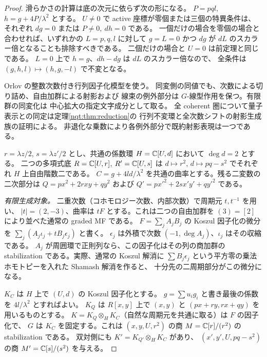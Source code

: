 \begin{proof}
滑らかさの計算は底の次元に依らず次の形になる。
$P=pql$, $h=g+4P/\lambda^2$ とする。
$U\ne0$ で active 座標が零個または三個の特異条件は、
それぞれ $dg=0$ または $P\ne0,\ dh=0$ である。
一個だけの場合を零個の場合と合わせれば、いずれかの $L=p,q,l$ に対して
$g=L=0$ かつ $dg$ が $dL$ のスカラー倍となることも排除すべきである。
二個だけの場合と $U=0$ は前定理と同じである。
$L=0$ 上で $h=g$、$dh-dg$ は $dL$ のスカラー倍なので、
全条件は $(g,h,l)\mapsto(h,g,-l)$ で不変となる。

Orlov の整数次数付き行列因子化模型を使う。
同変側の同値でも、次数による切り詰め、自由加群による射影および
線束の例外部分は $G$-線型作用を保つ。有限群の同変化は
中心拡大の指定文字成分として取る。
全 coherent 圏について量子表示との同定は定理\ref{nqt:thm:reduction}の
行列不変環と全次数シフトの射影生成族の証明による。
非退化な乗数により各例外部分で既約射影表現は一つである。

$r=\lambda z/2$, $s=\lambda z'/2$ とし、共通の係数環
$H=\mathbb C[U,d]$ において $\deg d=2$ とする。
二つの多項式底 $R=\mathbb C[U,r]$, $R'=\mathbb C[U,s]$ は
$d\mapsto r^2$, $d\mapsto pq-s^2$ でそれぞれ $H$ 上自由階数二である。
$C=g+4ld/\lambda^2$ を共通の曲率とする。残る二変数の二次部分は
$Q=px^2+2rxy+qy^2$ および $Q'=px'^2+2sx'y'+qy'^2$ である。

\emph{有限生成対象。}
二重次数（コホモロジー次数、内部次数）で周期元 $t,t^{-1}$ を用い、
$|t|=(2,-3)$、曲率は $tF$ とする。これは二つの自由加群を
$(3)=[2]$ により並べた通常の graded MF である。
$F=\sum_j A_jB_j$ の Koszul 因子化の微分を
$\sum_j(A_j\iota_j+t B_j\epsilon_j)$ と書く。
$\epsilon_j$ は外積で次数 $(-1,\deg A_j)$、$\iota_j$ はその収縮である。
$A_j$ が周囲環で正則列なら、この因子化はその列の商加群の
stabilization である。実際、通常の Koszul 解消に $\sum B_j\epsilon_j$
という平方零の乗法ホモトピーを入れた Shamash 解消を作ると、
十分先の二周期部分がこの微分になる。

$K_C$ は $H$ 上で $(U,d)$ の Koszul 因子化とする。
$g=\sum u_i g_i$ と書き最後の係数を $4l/\lambda^2$ とすればよい。
$K_Q$ は $R[x,y]$ 上で $(x,y)$ と $(px+ry,rx+qy)$ を用いるものとする。
$K=K_Q\otimes_H K_C$（自然な周期元を共通に取る）は $F$ の因子化で、
$G$ は $K_C$ を固定する。これは $(x,y,U,r^2)$ の商
$M=\mathbb C[r]/(r^2)$ の stabilization である。
双対側にも $K'=K_{Q'}\otimes_H K_C$ があり、
$(x',y',U,pq-s^2)$ の商 $M'=\mathbb C[s]/(s^2)$ を与える。


\end{proof}
